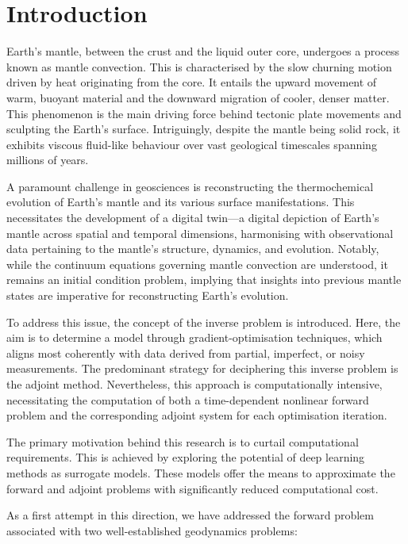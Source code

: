 \chapter{Introduction}

Earth's mantle, between the crust and the liquid outer core, undergoes a process known as mantle convection. This is characterised by the slow churning motion driven by heat originating from the core. It entails the upward movement of warm, buoyant material and the downward migration of cooler, denser matter. This phenomenon is the main driving force behind tectonic plate movements and sculpting the Earth's surface. Intriguingly, despite the mantle being solid rock, it exhibits viscous fluid-like behaviour over vast geological timescales spanning millions of years.

A paramount challenge in geosciences is reconstructing the thermochemical evolution of Earth's mantle and its various surface manifestations. This necessitates the development of a digital twin—a digital depiction of Earth's mantle across spatial and temporal dimensions, harmonising with observational data pertaining to the mantle's structure, dynamics, and evolution. Notably, while the continuum equations governing mantle convection are understood, it remains an initial condition problem, implying that insights into previous mantle states are imperative for reconstructing Earth's evolution.

To address this issue, the concept of the inverse problem is introduced. Here, the aim is to determine a model through gradient-optimisation techniques, which aligns most coherently with data derived from partial, imperfect, or noisy measurements. The predominant strategy for deciphering this inverse problem is the adjoint method. Nevertheless, this approach is computationally intensive, necessitating the computation of both a time-dependent nonlinear forward problem and the corresponding adjoint system for each optimisation iteration.

The primary motivation behind this research is to curtail computational requirements. This is achieved by exploring the potential of deep learning methods as surrogate models. These models offer the means to approximate the forward and adjoint problems with significantly reduced computational cost.

As a first attempt in this direction, we have addressed the forward problem associated with two well-established geodynamics problems: 

